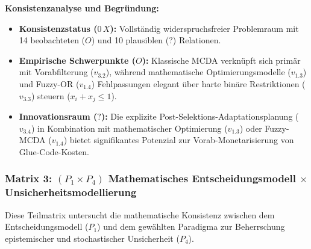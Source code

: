 \begin{landscape}
\vspace{1.2em}
\textbf{Konsistenzanalyse und Begründung:}
\begin{itemize}[leftmargin=*]
  \item \textbf{Konsistenzstatus ($0\,X$):} Vollständig widerspruchsfreier Problemraum mit 14 beobachteten ($O$) und 10 plausiblen ($?$) Relationen.
  \item \textbf{Empirische Schwerpunkte ($O$):} Klassische MCDA verknüpft sich primär mit Vorabfilterung ($v_{3.2}$), während mathematische Optimierungsmodelle ($v_{1.3}$) und Fuzzy-OR ($v_{1.4}$) Fehlpassungen elegant über harte binäre Restriktionen ($v_{3.3}$) steuern ($x_i + x_j \le 1$).
  \item \textbf{Innovationsraum ($?$):} Die explizite Post-Selektions-Adaptationsplanung ($v_{3.4}$) in Kombination mit mathematischer Optimierung ($v_{1.3}$) oder Fuzzy-MCDA ($v_{1.4}$) bietet signifikantes Potenzial zur Vorab-Monetarisierung von Glue-Code-Kosten.
\end{itemize}

\newpage
\subsubsection*{Matrix 3: $(P_1 \times P_4)$ Mathematisches Entscheidungsmodell $\times$ Unsicherheitsmodellierung}
\label{subsubsec:cca_matrix_3}

Diese Teilmatrix untersucht die mathematische Konsistenz zwischen dem Entscheidungsmodell ($P_1$) und dem gewählten Paradigma zur Beherrschung epistemischer und stochastischer Unsicherheit ($P_4$).


\end{landscape}
